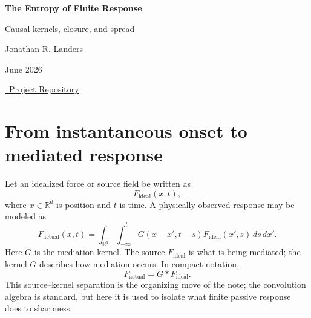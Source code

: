 \documentclass[10pt]{article}
\begin{document}
\begin{center}
{\LARGE \bfseries The Entropy of Finite Response\par}
\vspace{0.35em}
{\large Causal kernels, closure, and spread\par}
\vspace{1.2em}
{\large Jonathan R. Landers\par}
\vspace{0.5em}
{June 2026\par}
\vspace{0.35em}
{\small\href{https://github.com/jonland82/finite-response-kernels}{\faGithub\ Project Repository}\par}
\end{center}

\vspace{0.8em}

\begin{abstract}
Idealized models often describe a response as instantaneous. This note separates the source from the physical mediator: the observed response is the source convolved with a passive causal kernel. Such kernels have two elementary operations, convex mixing for parallel channels and convolution for sequential stages. The resulting moment laws show that hidden passive stages cannot sharpen an already mediated response; sharpness lives only on a singular boundary of the kernel space. Replacing variance by entropy power makes the statement strict: by the entropy power inequality and the support constraint imposed by causality, every nontrivial sequential stage increases entropy power by more than simple additivity would predict. The causal interior is therefore pinned between two unreachable walls---the delta locus $N=0$ and the Gaussian locus $N=\sigma^2$---with real finite-response dynamics living between them.
\end{abstract}

\section{From instantaneous onset to mediated response}

Let an idealized force or source field be written as
\[
F_{\mathrm{ideal}}(x,t),
\]
where $x\in\mathbb R^d$ is position and $t$ is time. A physically observed response may be modeled as
\begin{equation}\label{eq:general_kernel}
F_{\mathrm{actual}}(x,t)
=
\int_{\mathbb R^d}\int_{-\infty}^{t}
G(x-x',t-s)F_{\mathrm{ideal}}(x',s)\,ds\,dx'.
\end{equation}
Here $G$ is the mediation kernel. The source $F_{\mathrm{ideal}}$ is what is being mediated; the kernel $G$ describes how mediation occurs. In compact notation,
\[
F_{\mathrm{actual}}=G*F_{\mathrm{ideal}}.
\]
This source--kernel separation is the organizing move of the note; the convolution algebra is standard, but here it is used to isolate what finite passive response does to sharpness.
\end{document}
